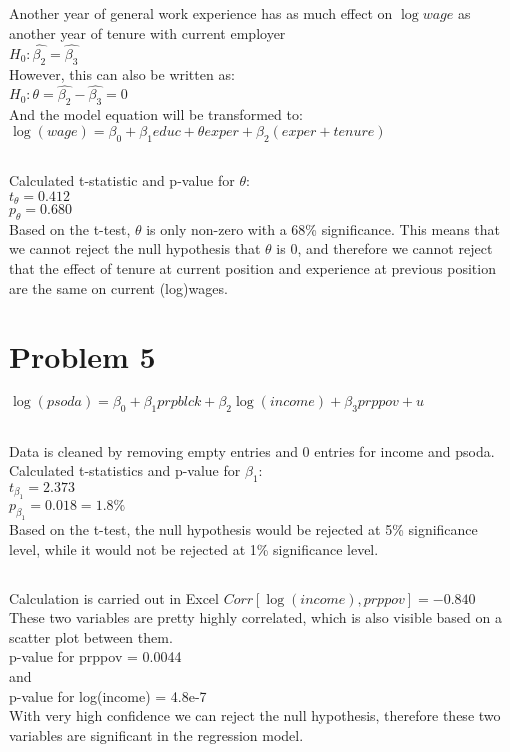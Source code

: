 \documentclass[11pt, oneside]{article}   	%
\begin{document}
\subsection{}
Another year of general work experience has as much effect on $\log{wage}$ as another year of tenure with current employer\\
\indent$H_0: \hat{\beta_2}=\hat{\beta_3}$\\
\indent However, this can also be written as:\\
\indent$H_0: \theta=\hat{\beta_2}-\hat{\beta_3}=0$\\
\indent And the model equation will be transformed to:\\
\indent$\log(wage)=\beta_0+\beta_1educ+\theta exper+\beta_2(exper+tenure)$\\
\subsection{}
Calculated t-statistic and p-value for $\theta$: \\
\indent$t_\theta=0.412$\\
\indent$p_\theta=0.680$\\
Based on the t-test, $\theta$ is only non-zero with a 68\% significance. This means that we cannot reject the null hypothesis that $\theta$ is 0, and therefore we cannot reject that the effect of tenure at current position and experience at previous position are the same on current (log)wages.

\section{Problem 5}
$\log(psoda)=\beta_0+\beta_1prpblck+\beta_2\log(income)+\beta_3prppov+u$\\
\subsection{}
Data is cleaned by removing empty entries and 0 entries for income and psoda.
Calculated t-statistics and p-value for $\beta_1$:\\
\indent$t_{\beta_1}=2.373$\\
\indent$p_{\beta_1}=0.018=1.8\%$\\
Based on the t-test, the null hypothesis would be rejected at 5\% significance level, while it would not be rejected at 1\% significance level.
\subsection{}
Calculation is carried out in Excel
$Corr[\log(income),prppov]=-0.840$\\
These two variables are pretty highly correlated, which is also visible based on a scatter plot between them.\\
p-value for prppov = 0.0044\\ and \\
p-value for log(income) = 4.8e-7\\
With very high confidence we can reject the null hypothesis, therefore these two variables are significant in the regression model.
\end{document}
